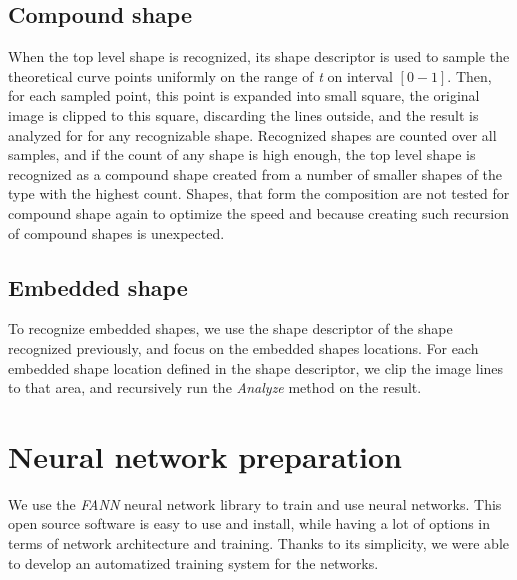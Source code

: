 \subsection{Compound shape}
When the top level shape is recognized, its shape descriptor is used to sample the theoretical curve points uniformly on the range of \emph{t} on interval $[0-1]$. Then, for each sampled point, this point is expanded into small square, the original image is clipped to this square, discarding the lines outside, and the result is analyzed for for any recognizable shape. Recognized shapes are counted over all samples, and if the count of any shape is high enough, the top level shape is recognized as a compound shape created from a number of smaller shapes of the type with the highest count. Shapes, that form the composition are not tested for compound shape again to optimize the speed and because creating such recursion of compound shapes is unexpected.

\subsection{Embedded shape}
To recognize embedded shapes, we use the shape descriptor of the shape recognized previously, and focus on the embedded shapes locations. For each embedded shape location defined in the shape descriptor, we clip the image lines to that area, and recursively run the \emph{Analyze} method on the result.

\section{Neural network preparation}
We use the \emph{FANN} neural network library to train and use neural networks. This open source software is easy to use and install, while having a lot of options in terms of network architecture and training. Thanks to its simplicity, we were able to develop an automatized training system for the networks.

